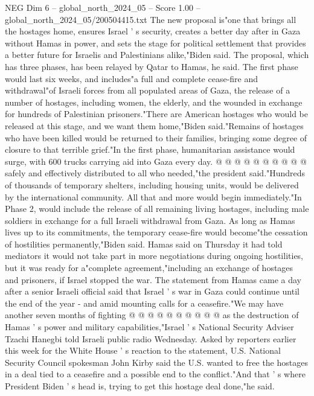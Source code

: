 \begin{textsample}{NEG Dim 6 – global\_north\_2024\_05 – Score 1.00 – global\_north\_2024\_05/200504415.txt}  \label{ex:f6_neg_293}
The new proposal is"one that brings all the hostages home, ensures Israel ' s security, creates a better day after in Gaza without Hamas in power, and sets the stage for political settlement that provides a better future for Israelis and Palestinians alike,"Biden said.
The proposal, which has three phases, has been relayed by Qatar to Hamas, he said.
The first phase would last six weeks, and includes"a full and complete cease-fire and withdrawal"of Israeli forces from all populated areas of Gaza, the release of a number of hostages, including women, the elderly, and the wounded in exchange for hundreds of Palestinian prisoners."There are American hostages who would be released at this stage, and we want them home,"Biden said."Remains of hostages who have been killed would be returned to their families, bringing some degree of closure to that terrible grief."In the first phase, humanitarian assistance would surge, with 600 trucks carrying aid into Gaza every day. @ @ @ @ @ @ @ @ @ @ safely and effectively distributed to all who needed,"the president said."Hundreds of thousands of temporary shelters, including housing units, would be delivered by the international community.
All that and more would begin immediately."In Phase 2, would include the release of all remaining living hostages, including male soldiers in exchange for a full Israeli withdrawal from Gaza.
As long as Hamas lives up to its commitments, the temporary cease-fire would become"the cessation of hostilities permanently,"Biden said.
Hamas said on Thursday it had told mediators it would not take part in more negotiations during ongoing hostilities, but it was ready for a"complete agreement,"including an exchange of hostages and prisoners, if Israel stopped the war.
The statement from Hamas came a day after a senior Israeli official said that Israel ' s war in Gaza could continue until the end of the year - and amid mounting calls for a ceasefire."We may have another seven months of fighting @ @ @ @ @ @ @ @ @ @ as the destruction of Hamas ' s power and military capabilities,"Israel ' s National Security Adviser Tzachi Hanegbi told Israeli public radio Wednesday.
Asked by reporters earlier this week for the White House ' s reaction to the statement, U.S.
National Security Council spokesman John Kirby said the U.S. wanted to free the hostages in a deal tied to a ceasefire and a possible end to the conflict."And that ' s where President Biden ' s head is, trying to get this hostage deal done,"he said.

\end{textsample}
